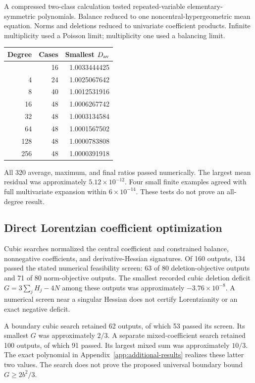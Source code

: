 A compressed two-class calculation tested repeated-variable elementary-symmetric polynomials. Balance reduced to one noncentral-hypergeometric mean equation. Norms and deletions reduced to univariate coefficient products. Infinite multiplicity used a Poisson limit; multiplicity one used a balancing limit.

{\def\LTcaptype{} %
\begin{longtable}[]{@{}rrr@{}}
\toprule\noalign{}
Degree & Cases & Smallest \(D_{\rm av}\) \\
\midrule\noalign{}
\endhead
\bottomrule\noalign{}
\endlastfoot
3 & 16 & 1.0033444425 \\
4 & 24 & 1.0025067642 \\
8 & 40 & 1.0012531916 \\
16 & 48 & 1.0006267742 \\
32 & 48 & 1.0003134584 \\
64 & 48 & 1.0001567502 \\
128 & 48 & 1.0000783808 \\
256 & 48 & 1.0000391918 \\
\end{longtable}
}

All 320 average, maximum, and final ratios passed numerically. The largest mean residual was approximately \(5.12\times10^{-12}\). Four small finite examples agreed with full multivariate expansion within \(6\times10^{-14}\). These tests do not prove an all-degree result.

\subsection{Direct Lorentzian coefficient optimization}\label{app:finite-9}

Cubic searches normalized the central coefficient and constrained balance, nonnegative coefficients, and derivative-Hessian signatures. Of 160 outputs, 134 passed the stated numerical feasibility screen: 63 of 80 deletion-objective outputs and 71 of 80 norm-objective outputs. The smallest recorded cubic deletion deficit \(G=3\sum_jH_j-4N\) among these outputs was approximately \(-3.76\times10^{-8}\). A numerical screen near a singular Hessian does not certify Lorentzianity or an exact negative deficit.

A boundary cubic search retained 62 outputs, of which 53 passed its screen. Its smallest \(G\) was approximately \(2/3\). A separate mixed-coefficient search retained 100 outputs, of which 91 passed. Its largest mixed sum was approximately \(10/3\). The exact polynomial in Appendix~\ref{app:additional-results} realizes these latter two values. The search does not prove the proposed universal boundary bound \(G\ge2b^2/3\).

